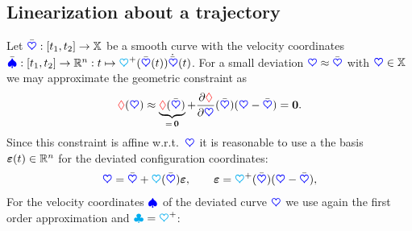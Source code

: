 \subsection{Linearization about a trajectory}\label{sec:LinAboutTraj}
Let $\sysCoordB : [t_1, t_2] \rightarrow \configSpace$ be a smooth curve with the velocity coordinates $\sysVelB : [t_1, t_2] \rightarrow \RealNum^{\dimConfigSpace} : t \mapsto \kinMat^+(\sysCoordB(t)) \sysCoordBd(t)$.
For a small deviation $\sysCoord \approx \sysCoordB$ with $\sysCoord \in \configSpace$ we may approximate the geometric constraint as
\begin{align}
 \geoConstraint(\sysCoord) \approx \underbrace{\geoConstraint(\sysCoordB)}_{=\,\tuple{0}} + \pdiff[\geoConstraint]{\sysCoord}(\sysCoordB) (\sysCoord - \sysCoordB) = \tuple{0}.
\end{align}
Since this constraint is affine w.r.t.\ $\sysCoord$ it is reasonable to use a the basis $\LinErrorCoord(t) \in \RealNum^{\dimConfigSpace}$ for the deviated configuration coordinates:
\begin{align}
 \sysCoord = \sysCoordB + \kinMat(\sysCoordB) \LinErrorCoord,
\qquad
 \LinErrorCoord = \kinMat^+(\sysCoordB) (\sysCoord - \sysCoordB),
\end{align}
For the velocity coordinates $\sysVel$ of the deviated curve $\sysCoord$ we use again the first order approximation and $\kinBasisMat = \kinMat^+$:
